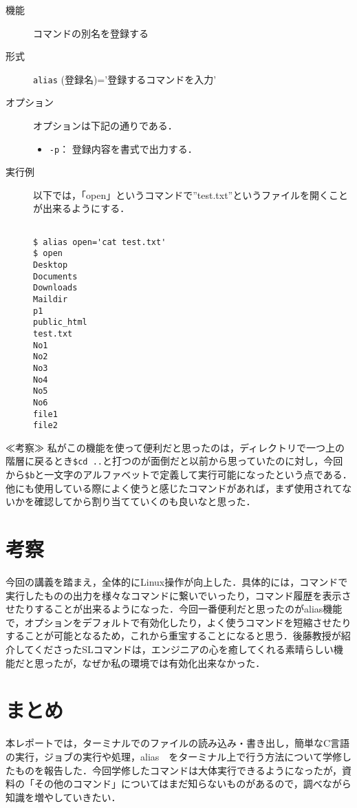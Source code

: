 \documentclass[a4j,11pt]{jarticle}
\begin{document}
\begin{description}
 \item [機能]
  コマンドの別名を登録する
 \item [形式]
  \verb|alias| (登録名)='登録するコマンドを入力'
 \item [オプション]
   オプションは下記の通りである．
    \begin{itemize}
      \item \verb|-p|：  登録内容を書式で出力する．
    \end{itemize}
 \item [実行例]

以下では，「open」というコマンドで”test.txt”というファイルを開くことが出来るようにする．
  \begin{verbatim}

$ alias open='cat test.txt'
$ open
Desktop
Documents
Downloads
Maildir
p1
public_html
test.txt
No1
No2
No3
No4
No5
No6
file1
file2

  \end{verbatim}

\end{description}

≪考察≫
私がこの機能を使って便利だと思ったのは，ディレクトリで一つ上の階層に戻るとき\verb|$cd ..|と打つのが面倒だと以前から思っていたのに対し，今回から\verb|$b|と一文字のアルファベットで定義して実行可能になったという点である．他にも使用している際によく使うと感じたコマンドがあれば，まず使用されてないかを確認してから割り当てていくのも良いなと思った．



\section{考察} %
今回の講義を踏まえ，全体的にLinux操作が向上した．具体的には，コマンドで実行したものの出力を様々なコマンドに繋いでいったり，コマンド履歴を表示させたりすることが出来るようになった．今回一番便利だと思ったのがalias機能で，オプションをデフォルトで有効化したり，よく使うコマンドを短縮させたりすることが可能となるため，これから重宝することになると思う．後藤教授が紹介してくださったSLコマンドは，エンジニアの心を癒してくれる素晴らしい機能だと思ったが，なぜか私の環境では有効化出来なかった．



\section{まとめ} %
本レポートでは，ターミナルでのファイルの読み込み・書き出し，簡単なC言語の実行，ジョブの実行や処理，alias　をターミナル上で行う方法について学修したものを報告した．今回学修したコマンドは大体実行できるようになったが，資料の「その他のコマンド」についてはまだ知らないものがあるので，調べながら知識を増やしていきたい．
\end{document}
